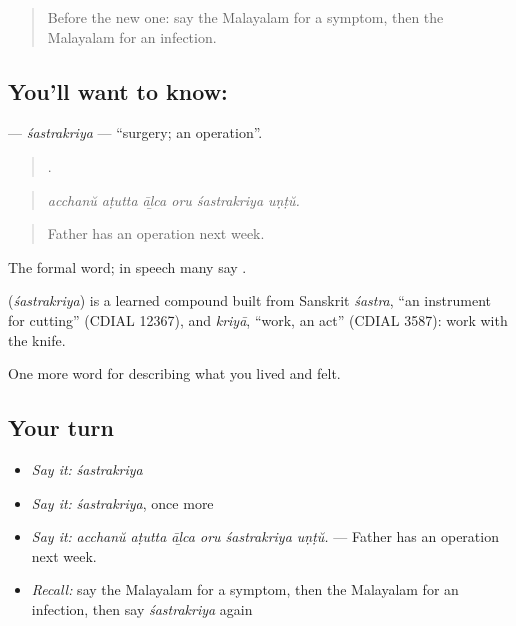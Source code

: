 \label{lesson:ML-C532-sastrakriya}



\begin{quote}
Before the new one: say the Malayalam for a symptom, then the Malayalam for an infection.
\end{quote}

\subsection*{You'll want to know: }
\textbf{} — \emph{śastrakriya} — \textquotedblleft{}surgery; an operation\textquotedblright{}.

\begin{quote}
     .
\end{quote}

\begin{quote}
\emph{acchanŭ aṭutta āḻca oru śastrakriya uṇṭŭ.}
\end{quote}

\begin{quote}
Father has an operation next week.
\end{quote}

The formal word; in speech many say .

\begin{cousinweb}
\textbf{} (\emph{śastrakriya}) is a learned compound built from Sanskrit \emph{śastra}, \textquotedblleft{}an instrument for cutting\textquotedblright{} (CDIAL 12367), and \emph{kriyā}, \textquotedblleft{}work, an act\textquotedblright{} (CDIAL 3587): work with the knife.
\end{cousinweb}

\begin{grammarlens}[title={What you've built}]
One more word for describing what you lived and felt.
\end{grammarlens}

\subsection*{Your turn}
\begin{itemize}
\raggedright
  \item \emph{Say it:} \emph{śastrakriya}
  \item \emph{Say it:} \emph{śastrakriya}, once more
  \item \emph{Say it:} \emph{acchanŭ aṭutta āḻca oru śastrakriya uṇṭŭ.} — Father has an operation next week.
  \item \emph{Recall:} say the Malayalam for a symptom, then the Malayalam for an infection, then say \emph{śastrakriya} again
\end{itemize}

